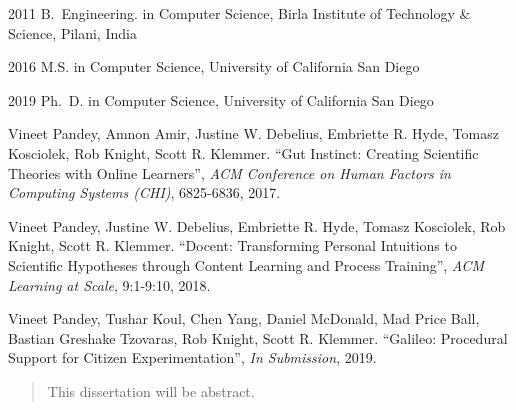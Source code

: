 \begin{frontmatter}
%
%
\begin{vitapage}
\begin{vita}
  \item[2011] B.~Engineering. in Computer Science, Birla Institute of Technology \& Science, Pilani, India
  \item[2016] M.S. in Computer Science, University of California San Diego
  \item[2019] Ph.~D. in Computer Science, University of California San Diego
\end{vita}
\begin{publications}
 \item Vineet Pandey, Amnon Amir, Justine W. Debelius, Embriette R. Hyde, Tomasz Kosciolek, Rob Knight, Scott R. Klemmer. ``Gut Instinct: Creating Scientific Theories
with Online Learners'', \emph{ACM Conference on Human Factors in Computing Systems (CHI)}, 6825-6836, 2017.
\item Vineet Pandey, Justine W. Debelius, Embriette R. Hyde, Tomasz Kosciolek, Rob Knight, Scott R. Klemmer. ``Docent: Transforming Personal Intuitions to Scientific Hypotheses
through Content Learning and Process Training'', \emph{ACM Learning at Scale}, 9:1-9:10,  2018.
\item Vineet Pandey, Tushar Koul, Chen Yang, Daniel McDonald, Mad Price Ball, Bastian Greshake Tzovaras, Rob Knight, Scott R. Klemmer. ``Galileo: Procedural Support for Citizen Experimentation'', \emph{In Submission},  2019.

\end{publications}
\end{vitapage}


%
%
\begin{abstract}
  This dissertation will be abstract.
\end{abstract}


\end{frontmatter}
